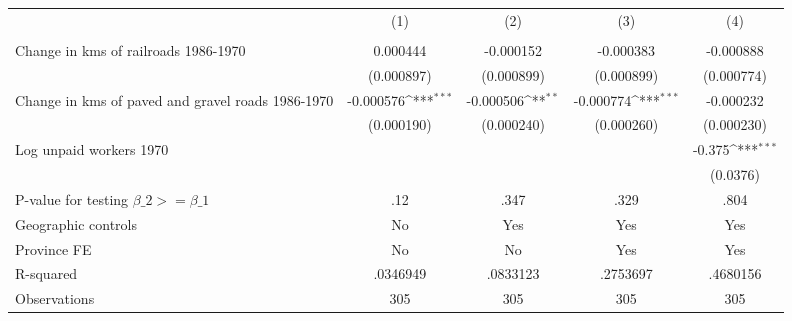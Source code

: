 {
\def\sym#1{\ifmmode^{#1}\else\(^{#1}\)\fi}
\begin{tabular}{l*{4}{c}}
\hline\hline
                &\multicolumn{1}{c}{(1)}&\multicolumn{1}{c}{(2)}&\multicolumn{1}{c}{(3)}&\multicolumn{1}{c}{(4)}\\
                &\multicolumn{1}{c}{}&\multicolumn{1}{c}{}&\multicolumn{1}{c}{}&\multicolumn{1}{c}{}\\
\hline
Change in kms of railroads 1986-1970& 0.000444         &-0.000152         &-0.000383         &-0.000888         \\
                &(0.000897)         &(0.000899)         &(0.000899)         &(0.000774)         \\
[1em]
Change in kms of paved and gravel roads 1986-1970&-0.000576\sym{***}&-0.000506\sym{**} &-0.000774\sym{***}&-0.000232         \\
                &(0.000190)         &(0.000240)         &(0.000260)         &(0.000230)         \\
[1em]
Log unpaid workers 1970&                  &                  &                  &   -0.375\sym{***}\\
                &                  &                  &                  & (0.0376)         \\
\hline
P-value for testing $\beta\_{2} >= \beta\_{1}$&      .12         &     .347         &     .329         &     .804         \\
Geographic controls&       No         &      Yes         &      Yes         &      Yes         \\
Province FE     &       No         &       No         &      Yes         &      Yes         \\
R-squared       & .0346949         & .0833123         & .2753697         & .4680156         \\
Observations    &      305         &      305         &      305         &      305         \\
\hline\hline
\end{tabular}
}
